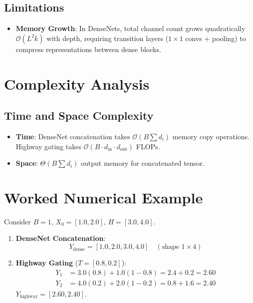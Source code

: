 \documentclass[11pt,a4paper]{article}
\theoremstyle{definition}
\begin{document}
\subsection{Limitations}
\begin{itemize}
    \item \textbf{Memory Growth}: In DenseNets, total channel count grows quadratically $\mathcal{O}(L^2 k)$ with depth, requiring transition layers ($1\times 1$ convs + pooling) to compress representations between dense blocks.
\end{itemize}

\section{Complexity Analysis}

\subsection{Time and Space Complexity}
\begin{itemize}
    \item \textbf{Time}: DenseNet concatenation takes $\mathcal{O}(B \sum d_i)$ memory copy operations. Highway gating takes $\mathcal{O}(B \cdot d_{\text{in}} \cdot d_{\text{out}})$ FLOPs.
    \item \textbf{Space}: $\Theta(B \sum d_i)$ output memory for concatenated tensor.
\end{itemize}

\section{Worked Numerical Example}

Consider $B=1$, $X_0 = [1.0, 2.0]$, $H = [3.0, 4.0]$.

\begin{enumerate}
    \item \textbf{DenseNet Concatenation}:
    \begin{equation}
    Y_{\text{dense}} = [1.0, 2.0, 3.0, 4.0] \quad (\text{shape } 1 \times 4)
    \end{equation}
    \item \textbf{Highway Gating} ($T = [0.8, 0.2]$):
    \begin{align}
    Y_1 &= 3.0(0.8) + 1.0(1 - 0.8) = 2.4 + 0.2 = 2.60 \\
    Y_2 &= 4.0(0.2) + 2.0(1 - 0.2) = 0.8 + 1.6 = 2.40
    \end{align}
    $Y_{\text{highway}} = [2.60, 2.40]$.
\end{enumerate}
\end{document}
